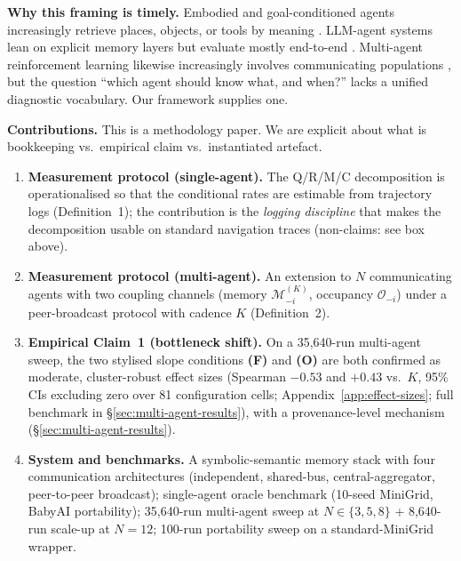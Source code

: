 \documentclass{article}
\begin{document}
\textbf{Why this framing is timely.} Embodied and goal-conditioned
agents increasingly retrieve places, objects, or tools by meaning
\citep{andrychowicz2017hindsight,ghosh2021learning,savva2019habitat}.
LLM-agent systems lean on explicit memory layers but evaluate mostly
end-to-end \citep{wang2023voyager,shinn2023reflexion,packer2023memgpt}.
Multi-agent reinforcement learning likewise increasingly involves
communicating populations \citep{lowe2017maddpg,foerster2018ctde}, but
the question ``which agent should know what, and when?'' lacks a
unified diagnostic vocabulary. Our framework supplies one.

\textbf{Contributions.} This is a methodology paper. We are explicit about what is bookkeeping vs.\ empirical claim vs.\ instantiated artefact.
\begin{enumerate}[leftmargin=20pt,itemsep=2pt,topsep=2pt]
\item \textbf{Measurement protocol (single-agent).} The Q/R/M/C decomposition is operationalised so that the conditional rates are estimable from trajectory logs (Definition~1); the contribution is the \emph{logging discipline} that makes the decomposition usable on standard navigation traces (non-claims: see box above).

\item \textbf{Measurement protocol (multi-agent).} An extension to $N$ communicating agents with two coupling channels (memory $\mathcal{M}_{-i}^{(K)}$, occupancy $\mathcal{O}_{-i}$) under a peer-broadcast protocol with cadence $K$ (Definition~2).

\item \textbf{Empirical Claim~1 (bottleneck shift).} On a 35{,}640-run multi-agent sweep, the two stylised slope conditions \textbf{(F)} and \textbf{(O)} are both confirmed as moderate, cluster-robust effect sizes (Spearman $-0.53$ and $+0.43$ vs.\ $K$, 95\% CIs excluding zero over 81 configuration cells; Appendix~\ref{app:effect-sizes}; full benchmark in \S\ref{sec:multi-agent-results}), with a provenance-level mechanism (\S\ref{sec:multi-agent-results}).

\item \textbf{System and benchmarks.} A symbolic-semantic memory stack with four communication architectures (independent, shared-bus, central-aggregator, peer-to-peer broadcast); single-agent oracle benchmark (10-seed MiniGrid, BabyAI portability); 35{,}640-run multi-agent sweep at $N\!\in\!\{3,5,8\}$ + 8{,}640-run scale-up at $N\!=\!12$; 100-run portability sweep on a standard-MiniGrid wrapper.


\end{enumerate}
\end{document}
